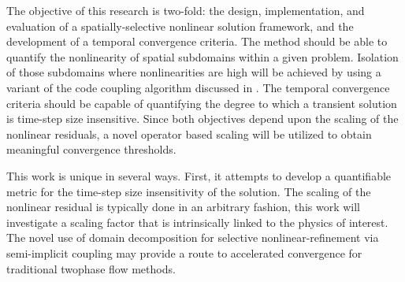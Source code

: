 The objective of this research is two-fold: the design, implementation, and evaluation of a spatially-selective nonlinear solution framework, and the development of a temporal convergence criteria.
The method should be able to quantify the nonlinearity of spatial subdomains within a given problem.
Isolation of those subdomains where nonlinearities are high will be achieved by using a variant of the code coupling algorithm discussed in .
The temporal convergence criteria should be capable of quantifying the degree to which a transient solution is time-step size insensitive.
Since both objectives depend upon the scaling of the nonlinear residuals, a novel operator based scaling will be utilized to obtain meaningful convergence thresholds.

This work is unique in several ways.
First, it attempts to develop a quantifiable metric for the time-step size insensitivity of the solution.
The scaling of the nonlinear residual is typically done in an arbitrary fashion, this work will investigate a scaling factor that is intrinsically linked to the physics of interest.
The novel use of domain decomposition for selective nonlinear-refinement via semi-implicit coupling may provide a route to accelerated convergence for traditional twophase flow methods.
